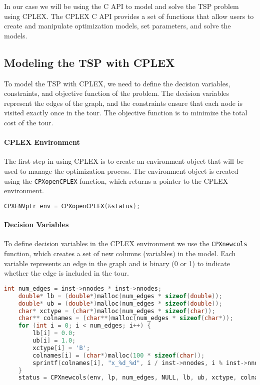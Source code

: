 \documentclass{article}
\begin{document}
In our case we will be using the C API to model and solve the TSP problem using CPLEX. The CPLEX C API provides a set of functions that allow users to create and manipulate optimization models, 
set parameters, and solve the models.

\subsection{Modeling the TSP with CPLEX}
To model the TSP with CPLEX, we need to define the decision variables, constraints, and objective function of the problem. 
The decision variables represent the edges of the graph, and the constraints ensure that each node is visited exactly once in the tour.
The objective function is to minimize the total cost of the tour.

\paragraph{CPLEX Environment}
The first step in using CPLEX is to create an environment object that will be used to manage the optimization process.
The environment object is created using the \texttt{CPXopenCPLEX} function, which returns a pointer to the CPLEX environment.

\begin{lstlisting}[language=C]
	CPXENVptr env = CPXopenCPLEX(&status);
\end{lstlisting}

\paragraph{Decision Variables}
To define decision variables in the CPLEX environment we use the \texttt{CPXnewcols} function, which creates a set of new columns (variables) in the model.
Each variable represents an edge in the graph and is binary (0 or 1) to indicate whether the edge is included in the tour.
\begin{lstlisting}[language=C]
	int num_edges = inst->nnodes * inst->nnodes;
	double* lb = (double*)malloc(num_edges * sizeof(double));
	double* ub = (double*)malloc(num_edges * sizeof(double));
	char* xctype = (char*)malloc(num_edges * sizeof(char));
	char** colnames = (char**)malloc(num_edges * sizeof(char*));
	for (int i = 0; i < num_edges; i++) {
		lb[i] = 0.0;
		ub[i] = 1.0;
		xctype[i] = 'B';
		colnames[i] = (char*)malloc(100 * sizeof(char));
		sprintf(colnames[i], "x_%d_%d", i / inst->nnodes, i % inst->nnodes);
	}
	status = CPXnewcols(env, lp, num_edges, NULL, lb, ub, xctype, colnames);
\end{lstlisting}
\end{document}
